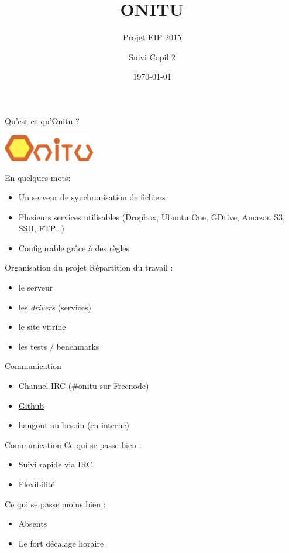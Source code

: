 \documentclass{beamer}
\begin{document}
\title[Suivi Copil]{ONITU}
\subtitle[]{Projet EIP 2015}
\author[Onitu]{Suivi Copil 2}
\date[short date]{\today}

\begin{frame}
\titlepage
\end{frame}

\begin{frame}{Qu'est-ce qu'Onitu ?}
\begin{center} 
  \includegraphics[width=0.3\textwidth]{onitu.png}
\end{center} 
En quelques mots:
\begin{itemize}
  \item Un serveur de synchronisation de fichiers
  \item Plusieurs services utilisables (Dropbox, Ubuntu One, GDrive, Amazon S3, SSH, FTP…)
  \item Configurable grâce à des règles
\end{itemize}
\end{frame}

\begin{frame}{Organisation du projet}
Répartition du travail :
\begin{itemize}
  \item le serveur
  \item les \emph{drivers} (services)
  \item le site vitrine
  \item les tests / benchmarks
\end{itemize}
\end{frame}

\begin{frame}{Communication}
\begin{itemize}
  \item Channel IRC (\#onitu sur Freenode)
  \item \underline{\hyperlink{https://github.com/onitu}{Github}}
  \item hangout au besoin (en interne)
\end{itemize}
\end{frame}

\begin{frame}{Communication}
Ce qui se passe bien :
\begin{itemize}
  \item Suivi rapide via IRC
  \item Flexibilité
\end{itemize}
Ce qui se passe moins bien :
\begin{itemize}
  \item Absents
  \item Le fort décalage horaire
\end{itemize}
\end{frame}
\end{document}
